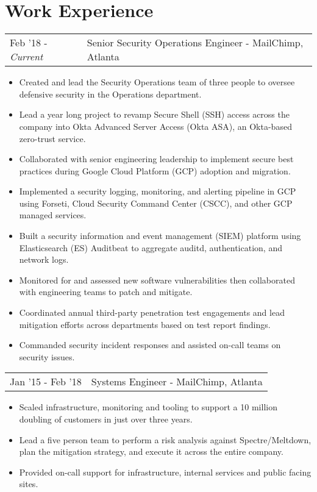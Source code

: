 \documentclass[letterpaper]{article}
\begin{document}
\section*{Work Experience}
\begin{tabular}{l|l}
{Feb '18 - \emph{Current}} & Senior Security Operations Engineer - MailChimp, Atlanta\\
\end{tabular}
\begin{itemize}[itemsep=0.5pt]
	\item Created and lead the Security Operations team of three people to oversee defensive security in the Operations department.
	\item Lead a year long project to revamp Secure Shell (SSH) access across the company into Okta Advanced Server Access (Okta ASA), an Okta-based zero-trust service. 
	\item Collaborated with senior engineering leadership to implement secure best practices during Google Cloud Platform (GCP) adoption and migration.
	\item Implemented a security logging, monitoring, and alerting pipeline in GCP using Forseti, Cloud Security Command Center (CSCC), and other GCP managed services.
	\item Built a security information and event management (SIEM) platform using Elasticsearch (ES) Auditbeat to aggregate auditd, authentication, and network logs.
	\item Monitored for and assessed new software vulnerabilities then collaborated with engineering teams to patch and mitigate.
	\item Coordinated annual third-party penetration test engagements and lead mitigation efforts across departments based on test report findings.
	\item Commanded security incident responses and assisted on-call teams on security issues.
\end{itemize}
\begin{tabular}{l|l}
{Jan '15 - Feb '18} & Systems Engineer - MailChimp, Atlanta\\
\end{tabular}
\begin{itemize}[itemsep=0.5pt]
	\item Scaled infrastructure, monitoring and tooling to support a 10 million doubling of customers in just over three years.
	\item Lead a five person team to perform a risk analysis against Spectre/Meltdown, plan the mitigation strategy, and execute it across the entire company.
	\item Provided on-call support for infrastructure, internal services and public facing sites.
\end{itemize}
\end{document}
